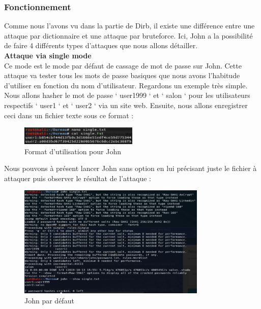 \subsubsection{Fonctionnement}

Comme nous l’avons vu dans la partie de Dirb, il existe une différence entre une attaque par dictionnaire et une attaque par bruteforce. Ici, John a la possibilité de faire 4 différents types d’attaques que nous allons détailler.\\

\noindent \textbf{Attaque via single mode}\\

Ce mode est le mode par défaut de cassage de mot de passe sur John. Cette attaque va tester tous les mots de passe basiques que nous avons l’habitude d’utiliser en fonction du nom d’utilisateur. Regardons un exemple très simple.
Nous allons hasher le mot de passe ‘ user1999 ‘ et ‘ salon ‘ pour les utilisateurs respectifs ‘ user1 ‘ et ‘ user2 ‘ via un site web.
Ensuite, nous allons enregistrer ceci dans un fichier texte sous ce format :

\begin{figure}[htp!]
  \centering
  \setlength\figureheight{7cm}
  \setlength\figurewidth{9cm}
  \includegraphics[width=0.5\textwidth]{oui/Ancien/imangeancien/john/format_txt.PNG}
  \caption{Format d'utilisation pour John}
  \label{fig:courbe-tikz}
\end{figure}

Nous pouvons à présent lancer John sans option en lui précisant juste le fichier à attaquer puis observer le résultat de l’attaque :

\begin{figure}[htp!]
  \centering
  \setlength\figureheight{7cm}
  \setlength\figurewidth{9cm}
  \includegraphics[width=0.8\textwidth]{oui/Ancien/imangeancien/john/affichage_mdp_single.PNG}
  \caption{John par défaut}
  \label{fig:courbe-tikz}
\end{figure}

